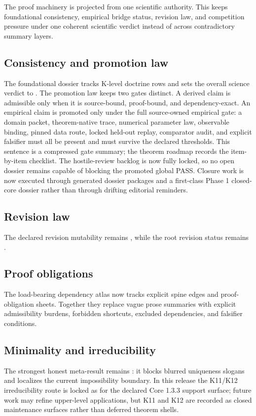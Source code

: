 The proof machinery is projected from one scientific authority. This keeps foundational consistency, empirical bridge status, revision law, and competition pressure under one coherent scientific verdict instead of across contradictory summary layers.

\subsection{Consistency and promotion law}
The foundational dossier tracks  K-level doctrine rows and sets the overall science verdict to .
The promotion law keeps two gates distinct. A derived claim is admissible only when it is source-bound, proof-bound, and dependency-exact. An empirical claim is promoted only under the full source-owned empirical gate: a domain packet, theorem-native trace, numerical parameter law, observable binding, pinned data route, locked held-out replay, comparator audit, and explicit falsifier must all be present and must survive the declared thresholds. This sentence is a compressed gate summary; the theorem roadmap records the item-by-item checklist.
The hostile-review backlog is now fully locked, so no open dossier remains capable of blocking the promoted global PASS.
Closure work is now executed through generated dossier packages and a first-class Phase 1 closed-core dossier rather than through drifting editorial reminders.

\subsection{Revision law}
The declared revision mutability remains , while the root revision status remains .

\subsection{Proof obligations}
The load-bearing dependency atlas now tracks  explicit spine edges and  proof-obligation sheets. Together they replace vague prose summaries with explicit admissibility burdens, forbidden shortcuts, excluded dependencies, and falsifier conditions.

\subsection{Minimality and irreducibility}
The strongest honest meta-result remains : it blocks blurred uniqueness slogans and localizes the current impossibility boundary. In this release the K11/K12 irreducibility route is locked as  for the declared Core 1.3.3 support surface; future work may refine upper-level applications, but K11 and K12 are recorded as closed maintenance surfaces rather than deferred theorem shells.

